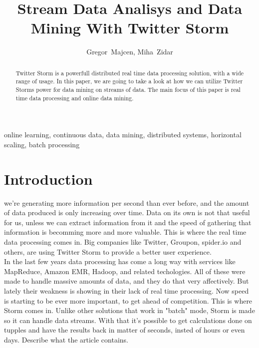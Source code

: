 \documentclass[journal]{IEEEtran/IEEEtran}
\begin{document}
\title{Stream Data Analisys and Data Mining With Twitter Storm}

\author{Gregor~Majcen, Miha~Zidar}%
\maketitle
\begin{abstract}
    Twitter Storm is a powerfull distributed real time data processing solution, with a wide range of usage. In this paper, we are going to take a look at how we can utilize Twitter Storms power for data mining on streams of data. The main focus of this paper is real time data processing and online data mining.
\end{abstract}

\begin{IEEEkeywords}
    online learning, continuous data, data mining, distributed systems, horizontal scaling, batch processing
\end{IEEEkeywords}

\IEEEpeerreviewmaketitle


\section{Introduction}
 we're generating more information per second than ever before, and the amount of data produced is only increasing over time. Data on its own is not that useful for us, unless we can extract information from it and the speed of gathering that information is becomming more and more valuable. This is where the real time data processing comes in. Big companies like Twitter, Groupon, spider.io and others, are using Twitter Storm to provide a better user experience.\\

In the last few years data processing has come a long way with services like MapReduce, Amazon EMR, Hadoop, and related techologies. All of these were made to handle massive amounts of data, and they do that very affectively. But lately their weakness is showing in their lack of real time processing. Now speed is starting to be ever more important, to get ahead of competition. This is where Storm comes in. Unlike other solutions that work in "batch" mode, Storm is made so it can handle data streams. With that it's possible to get calculations done on tupples and have the results back in matter of seconds, insted of hours or even days.
Describe what the article contains.
\end{document}
